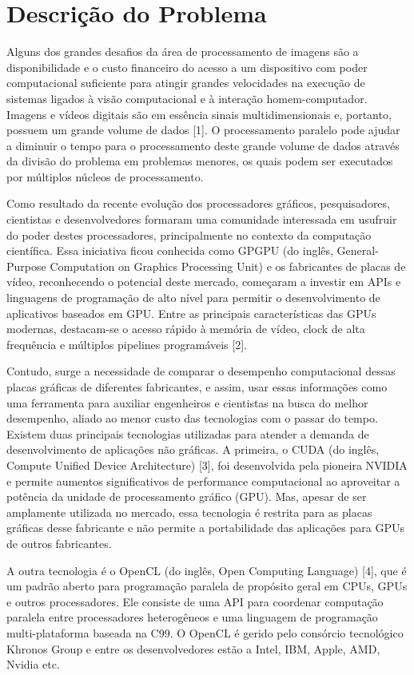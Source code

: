 \section{Descrição do Problema}
Alguns dos grandes desafios da área de processamento de imagens são a disponibilidade e o custo financeiro do acesso a um dispositivo com poder computacional suficiente para atingir grandes velocidades na execução de sistemas ligados à visão computacional e à interação homem-computador. Imagens e vídeos digitais são em essência sinais multidimensionais e, portanto, possuem um grande volume de dados [1]. O processamento paralelo pode ajudar a diminuir o tempo para o processamento deste grande volume de dados através da divisão do problema em problemas menores, os quais podem ser executados por múltiplos núcleos de processamento.

Como resultado da recente evolução dos processadores gráficos, pesquisadores, cientistas e desenvolvedores formaram uma comunidade interessada em usufruir do poder destes processadores, principalmente no contexto da computação científica. Essa iniciativa ficou conhecida como GPGPU (do inglês, General-Purpose Computation on Graphics Processing  Unit) e os fabricantes de placas de vídeo, reconhecendo o potencial deste mercado, começaram a investir em APIs e linguagens de programação de alto nível para permitir o desenvolvimento de aplicativos baseados em GPU. Entre as principais características das GPUs modernas, destacam-se o acesso rápido à memória de vídeo, clock de alta frequência e múltiplos pipelines programáveis [2].

Contudo, surge a necessidade de comparar o desempenho computacional dessas placas gráficas de diferentes fabricantes, e assim, usar essas informações como uma ferramenta para auxiliar engenheiros e cientistas na busca do melhor desempenho, aliado ao menor custo das tecnologias com o passar do tempo.
Existem duas principais tecnologias utilizadas para atender a demanda de desenvolvimento de aplicações não gráficas. A primeira, o CUDA (do inglês, Compute Unified Device Architecture) [3], foi desenvolvida pela pioneira NVIDIA e permite aumentos significativos de performance computacional ao aproveitar a potência da unidade de processamento gráfico (GPU). Mas, apesar de ser amplamente utilizada no mercado, essa tecnologia é restrita para as placas gráficas desse fabricante e não permite a portabilidade das aplicações para GPUs de outros fabricantes.

A outra tecnologia é o OpenCL (do inglês, Open Computing Language) [4], que é um padrão aberto para programação paralela de propósito geral em CPUs, GPUs e outros processadores. Ele consiste de uma API para coordenar computação paralela entre processadores heterogêneos e uma linguagem de programação multi-plataforma baseada na C99. O OpenCL é gerido pelo consórcio tecnológico Khronos Group e entre os desenvolvedores estão a Intel, IBM, Apple, AMD, Nvidia etc.

